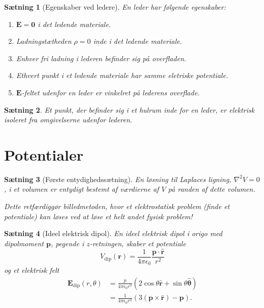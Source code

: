 \documentclass[]{article}
\newcommand{\hr}{\hat{\mathbf{r}}}
\newcommand{\hth}{\hat{\bm{\theta}}}
\newtheorem{theorem}{Sætning}
\theoremstyle{definition}
\begin{document}
\begin{theorem}[Egenskaber ved ledere]
	En leder har følgende egenskaber:
	\begin{enumerate}
		\item  $\mathbf{E} = \mathbf{0}$ i det ledende materiale.
		\item  Ladningstætheden $\rho = 0$ inde i det ledende materiale.
		\item Enhver fri ladning i lederen befinder sig på overfladen.
		\item Ethvert punkt i et ledende materiale har samme eletriske potentiale.
		\item $\mathbf{E}$-feltet udenfor en leder er vinkelret på lederens overflade.
	\end{enumerate} 
\end{theorem}

\begin{theorem}
	Et punkt, der befinder sig i et hulrum inde for en leder, er elektrisk isoleret fra omgivelserne udenfor lederen.
\end{theorem}

\section{Potentialer}

\begin{theorem}[Første entydighedssætning]
	En løsning til Laplaces ligning, $\nabla^2 V = 0$, i et volumen er entydigt bestemt af værdierne af $V$ på randen af dette volumen.
	
	Dette retfærdiggør billedmetoden, hvor et elektrostatisk problem (finde et potentiale) kan løses ved at løse et helt andet fysisk problem!
\end{theorem}

\begin{theorem}[Ideel elektrisk dipol]
	En ideel elektrisk dipol i origo med dipolmoment $\mathbf{p}$, pegende i $z$-retningen, skaber et potentiale
	\begin{equation*}
		V_\text{dip}(\mathbf{r}) = \frac{1}{4\pi \epsilon_0} \frac{\mathbf{p} \cdot \hat {\mathbf{r}}}{r^2}
	\end{equation*}
	og et elektrisk felt
	\begin{align*}
		\mathbf{E}_\text{dip}(r, \theta) &= \frac{p}{4\pi \epsilon_0  r^3}(2 \cos \theta \hr + \sin \theta \hth)\\
		&= \frac{1}{4\pi \epsilon_0  r^3}(3(\mathbf{p}\times \hr) - \mathbf{p}).
	\end{align*}
\end{theorem}
\end{document}
